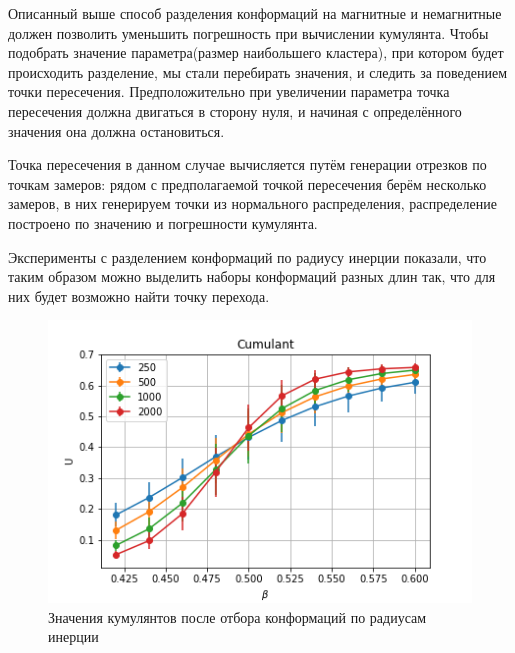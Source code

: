 Описанный выше способ разделения конформаций на магнитные и немагнитные должен позволить уменьшить погрешность при вычислении кумулянта. Чтобы подобрать значение параметра(размер наибольшего кластера), при котором будет происходить разделение, мы стали перебирать значения, и следить за поведением точки пересечения. Предположительно при увеличении параметра точка пересечения должна двигаться в сторону нуля, и начиная с определённого значения она должна остановиться.

Точка пересечения в данном случае вычисляется путём генерации отрезков по точкам замеров: рядом с предполагаемой точкой пересечения берём несколько замеров, в них генерируем точки из нормального распределения, распределение построено по значению и погрешности кумулянта.


Эксперименты с разделением конформаций по радиусу инерции показали, что таким образом можно выделить наборы конформаций разных длин так, что для них будет возможно найти точку перехода.

\begin{figure}[h]
	\centering
	\includegraphics[width=1\textwidth]{../images/Cumulant_beta0.4_0.6.png} 
	\caption{Значения кумулянтов после отбора конформаций по радиусам инерции}
\end{figure}
